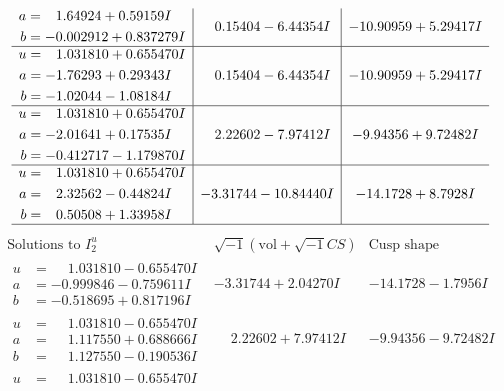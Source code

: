 \documentclass[1p]{elsarticle_modified}
\theoremstyle{definition}
\newcommand{\I}{\sqrt{-1}}
\begin{document}
$$\begin{array}{c|c|c}
\begin{aligned}
a &= \phantom{-}1.64924 + 0.59159 I \\
b &= -0.002912 + 0.837279 I\end{aligned}
 & \phantom{-}0.15404 - 6.44354 I & -10.90959 + 5.29417 I \\ \hline\begin{aligned}
u &= \phantom{-}1.031810 + 0.655470 I \\
a &= -1.76293 + 0.29343 I \\
b &= -1.02044 - 1.08184 I\end{aligned}
 & \phantom{-}0.15404 - 6.44354 I & -10.90959 + 5.29417 I \\ \hline\begin{aligned}
u &= \phantom{-}1.031810 + 0.655470 I \\
a &= -2.01641 + 0.17535 I \\
b &= -0.412717 - 1.179870 I\end{aligned}
 & \phantom{-}2.22602 - 7.97412 I & -9.94356 + 9.72482 I \\ \hline\begin{aligned}
u &= \phantom{-}1.031810 + 0.655470 I \\
a &= \phantom{-}2.32562 - 0.44824 I \\
b &= \phantom{-}0.50508 + 1.33958 I\end{aligned}
 & -3.31744 - 10.84440 I & -14.1728 + 8.7928 I\\
 \hline 
 \end{array}$$\newpage$$\begin{array}{c|c|c}  
\text{Solutions to }I^u_{2}& \I (\text{vol} + \sqrt{-1}CS) & \text{Cusp shape}\\
 \hline 
\begin{aligned}
u &= \phantom{-}1.031810 - 0.655470 I \\
a &= -0.999846 - 0.759611 I \\
b &= -0.518695 + 0.817196 I\end{aligned}
 & -3.31744 + 2.04270 I & -14.1728 - 1.7956 I \\ \hline\begin{aligned}
u &= \phantom{-}1.031810 - 0.655470 I \\
a &= \phantom{-}1.117550 + 0.688666 I \\
b &= \phantom{-}1.127550 - 0.190536 I\end{aligned}
 & \phantom{-}2.22602 + 7.97412 I & -9.94356 - 9.72482 I \\ \hline\begin{aligned}
u &= \phantom{-}1.031810 - 0.655470 I \\

\end{aligned}
\end{array}$$
\end{document}
